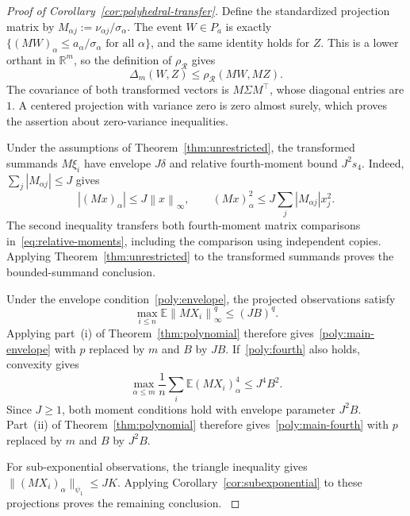 \documentclass[11pt,letterpaper]{article}
\newenvironment{recovered}{}{}
\theoremstyle{remark}
\newcommand{\E}{\mathbb E}
\newcommand{\R}{\mathbb R}
\newcommand{\norm}[1]{\left\lVert#1\right\rVert}
\newcommand{\rh}{\rho_{\mathcal R}}
\begin{document}
\begin{proof}[Proof of Corollary~\ref{cor:polyhedral-transfer}]
\begin{recovered}
Define the standardized projection matrix by
\(M_{\alpha j}:=\nu_{\alpha j}/\sigma_\alpha\).
\end{recovered}
The event \(W\in P_a\) is exactly
\(\{(MW)_\alpha\le a_\alpha/\sigma_\alpha\text{ for all }\alpha\}\),
and the same identity holds for \(Z\). This is a lower orthant in
\(\R^m\), so the definition of \(\rh\) gives
\begin{equation}
 \Delta_m(W,Z)\le\rh(MW,MZ).
 \label{eq:polyhedral-transfer}
\end{equation}
The covariance of both transformed vectors
is \(M\Sigma M^\top\), whose diagonal entries are \(1\).
A centered projection with variance zero is zero almost surely,
which proves the assertion about zero-variance inequalities.

Under the assumptions of Theorem~\ref{thm:unrestricted}, the
transformed summands \(M\xi_i\) have envelope \(J\delta\) and
relative fourth-moment bound \(J^2s_4\).
Indeed, \(\sum_j|M_{\alpha j}|\le J\) gives
\[
 |(Mx)_\alpha|\le J\norm{x}_\infty,
 \qquad
 (Mx)_\alpha^2\le J\sum_j|M_{\alpha j}|x_j^2.
\]
The second inequality transfers both fourth-moment matrix comparisons
in~\eqref{eq:relative-moments}, including the comparison using
independent copies. \begin{recovered}Applying
Theorem~\ref{thm:unrestricted} to the transformed summands proves the
bounded-summand conclusion.\end{recovered}

\begin{recovered}
Under the envelope condition~\eqref{poly:envelope}, the projected
observations satisfy
\[
 \max_{i\le n}\E\norm{MX_i}_\infty^q\le(JB)^q.
\]
Applying part~\textup{(i)} of Theorem~\ref{thm:polynomial} therefore
gives~\eqref{poly:main-envelope} with \(p\) replaced by \(m\) and
\(B\) by \(JB\). If~\eqref{poly:fourth} also holds, convexity gives
\[
 \max_{\alpha\le m}\frac1n\sum_i\E(MX_i)_\alpha^4\le J^4B^2.
\]
Since \(J\ge1\), both moment conditions hold with envelope parameter
\(J^2B\). Part~\textup{(ii)} of Theorem~\ref{thm:polynomial}
therefore gives~\eqref{poly:main-fourth} with \(p\) replaced by
\(m\) and \(B\) by \(J^2B\).
\end{recovered}

For sub-exponential observations, the triangle inequality gives
\(\|(MX_i)_\alpha\|_{\psi_1}\le JK\).
\begin{recovered}
Applying Corollary~\ref{cor:subexponential} to these projections proves
the remaining conclusion.
\end{recovered}
\end{proof}
\end{document}
